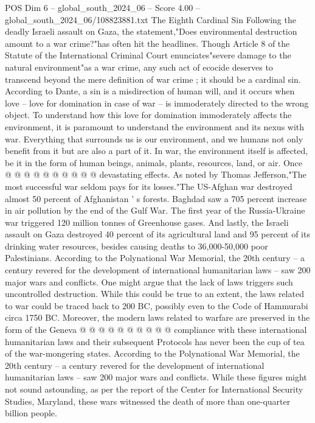 \begin{textsample}{POS Dim 6 – global\_south\_2024\_06 – Score 4.00 – global\_south\_2024\_06/108823881.txt}  \label{ex:f6_pos_160}
The Eighth Cardinal Sin Following the deadly Israeli assault on Gaza, the statement,"Does environmental destruction amount to a war crime?"has often hit the headlines.
Though Article 8 of the Statute of the International Criminal Court enunciates"severe damage to the natural environment"as a war crime, any such act of ecocide deserves to transcend beyond the mere definition of war crime ; it should be a cardinal sin.
According to Dante, a sin is a misdirection of human will, and it occurs when love -- love for domination in case of war -- is immoderately directed to the wrong object.
To understand how this love for domination immoderately affects the environment, it is paramount to understand the environment and its nexus with war.
Everything that surrounds us is our environment, and we humans not only benefit from it but are also a part of it.
In war, the environment itself is affected, be it in the form of human beings, animals, plants, resources, land, or air.
Once @ @ @ @ @ @ @ @ @ @ devastating effects.
As noted by Thomas Jefferson,"The most successful war seldom pays for its losses."The US-Afghan war destroyed almost 50 percent of Afghanistan ' s forests.
Baghdad saw a 705 percent increase in air pollution by the end of the Gulf War.
The first year of the Russia-Ukraine war triggered 120 million tonnes of Greenhouse gases.
And lastly, the Israeli assault on Gaza destroyed 40 percent of its agricultural land and 95 percent of its drinking water resources, besides causing deaths to 36,000-50,000 poor Palestinians.
According to the Polynational War Memorial, the 20th century -- a century revered for the development of international humanitarian laws -- saw 200 major wars and conflicts.
One might argue that the lack of laws triggers such uncontrolled destruction.
While this could be true to an extent, the laws related to war could be traced back to 200 BC, possibly even to the Code of Hammurabi circa 1750 BC.
Moreover, the modern laws related to warfare are preserved in the form of the Geneva @ @ @ @ @ @ @ @ @ @ compliance with these international humanitarian laws and their subsequent Protocols has never been the cup of tea of the war-mongering states.
According to the Polynational War Memorial, the 20th century -- a century revered for the development of international humanitarian laws -- saw 200 major wars and conflicts.
While these figures might not sound astounding, as per the report of the Center for International Security Studies, Maryland, these wars witnessed the death of more than one-quarter billion people.

\end{textsample}
